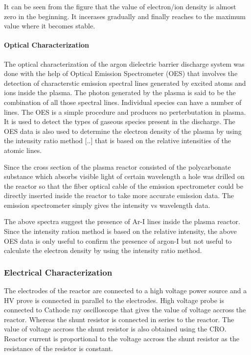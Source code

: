 \documentclass[11pt]{article}
\begin{document}
It can be seen from the figure that the value of electron/ion density is
almost zero in the beginning. It incerases gradually and finally reaches
to the maximum value where it becomes stable.

\paragraph{Optical Characterization}\label{optical-characterization}

The optical characterization of the argon dielectric barrier discharge
system was done with the help of Optical Emission Spectrometer (OES)
that involves the detection of characterstic emission spectral lines
generated by excited atoms and ions inside the plasma. The photon
generated by the plasma is said to be the combination of all those
spectral lines. Individual species can have a number of lines. The OES
is a simple procedure and produces no perterbutation in plasma. It is
used to detect the types of gaseous species present in the discharge.
The OES data is also used to determine the electron density of the
plasma by using the intensity ratio method {[}..{]} that is based on the
relative intensities of the atomic lines.

Since the cross section of the plasma reactor consisted of the
polycarbonate substance which absorbs visible light of certain
wavelength a hole was drilled on the reactor so that the fiber optical
cable of the emission spectrometer could be directly inserted inside the
reactor to take more accurate emission data. The emission spectrometer
simply gives the intensity vs wavelength data.

The above spectra suggest the presence of Ar-I lines inside the plasma
reactor. Since the intensity ration method is based on the relative
intensity, the above OES data is only useful to confirm the presence of
argon-I but not useful to calculate the electron density by using the
intensity ratio method.

    \subsubsection{Electrical
Characterization}\label{electrical-characterization}

The electrodes of the reactor are connected to a high voltage power
source and a HV prove is connected in parallel to the electrodes. High
voltage probe is connected to Cathode ray oscilloscope that gives the
value of voltage accross the reactor. Whereas the shunt resistor is
connected in series to the reactor. The value of voltage accross the
shunt resistor is also obtained using the CRO. Reactor current is
proportional to the voltage accross the shunt resistor as the resistance
of the resistor is constant.
\end{document}
